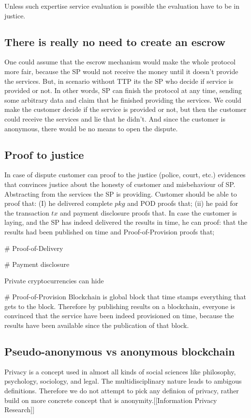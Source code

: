 \documentclass{article}
\begin{document}
Unless such expertise service evaluation is possible the evaluation have to be in justice. 



\subsection{There is really no need to create an escrow}
One could assume that the escrow mechanism would make the whole protocol more fair, because the SP would not receive the money until it doesn't provide the services. But, in scenario without TTP its the SP who decide if service is provided or not. In other words, SP can finish the protocol at any time, sending some arbitrary data and claim that he finished providing the services. We could make the customer decide if the service is provided or not, but then the customer could receive the services and lie that he didn't. And since the customer is anonymous, there would be no means to open the dispute.


\subsection{Proof to justice}
In case of dispute customer can proof to the justice (police, court, etc.) evidences that convinces justice about the honesty of customer and misbehaviour of SP. Abstracting from the services the SP is providing. Customer should be able to proof that: (I) he delivered complete $pkg$ and POD proofs that; (ii) he paid for the transaction $tx$ and payment disclosure proofs that.
In case the customer is laying, and the SP has indeed delivered the results in time, he can proof: that the results had been published on time and Proof-of-Provision proofs that;


# Proof-of-Delivery

# Payment disclosure

Private cryptocurrencies can hide

# Proof-of-Provision
Blockchain is global block that time stamps everything that gets to the block. Therefore by publishing results on a blockchain, everyone is convinced that the service have been indeed provisioned on time, because the results have been available since the publication of that block. 


\subsection{Pseudo-anonymous vs anonymous blockchain}
Privacy is a concept used in almost all kinds of social sciences like philosophy, psychology, sociology, and legal. The multidisciplinary nature leads to ambigous definitions. Therefore we do not attempt to pick any definion of privacy, rather build on more concrete concept that is anonymity.[[Information Privacy Research]]
\end{document}
